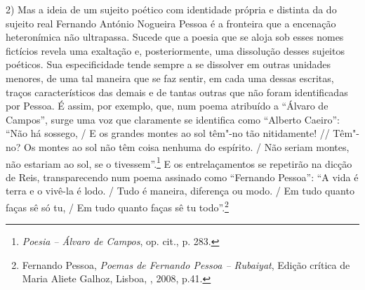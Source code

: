 2) Mas a ideia de um sujeito poético com identidade própria e distinta
da do sujeito real Fernando António Nogueira Pessoa é a fronteira que a
encenação heteronímica não ultrapassa. Sucede que a poesia que se aloja
sob esses nomes fictícios revela uma exaltação e, posteriormente, uma
dissolução desses sujeitos poéticos. Sua especificidade tende sempre a
se dissolver em outras unidades menores, de uma tal maneira que se faz
sentir, em cada uma dessas escritas, traços característicos das demais e
de tantas outras que não foram identificadas por Pessoa. É assim, por
exemplo, que, num poema atribuído a ``Álvaro de Campos'', surge uma voz
que claramente se identifica como ``Alberto Caeiro'': ``Não há sossego,
/ E os grandes montes ao sol têm"-no tão nitidamente! // Têm"-no? Os
montes ao sol não têm coisa nenhuma do espírito. / Não seriam montes,
não estariam ao sol, se o tivessem''.\footnote{\emph{Poesia -- Álvaro de
  Campos}, op. cit., p. 283.} E os entrelaçamentos se repetirão na
dicção de Reis, transparecendo num poema assinado como ``Fernando
Pessoa'': ``A vida é terra e o vivê-la é lodo. / Tudo é maneira,
diferença ou modo. / Em tudo quanto faças sê só tu, / Em tudo quanto
faças sê tu todo''.\footnote{Fernando Pessoa, \emph{Poemas de Fernando
  Pessoa -- Rubaiyat}, Edição crítica de Maria Aliete Galhoz, Lisboa,
  , 2008, p.41.}

